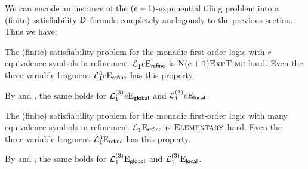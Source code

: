 We can encode an instance of the $(e+1)$-exponential tiling problem into a
(finite) satisfiability ${\mathrm{D}}$-formula completely analogously to the previous
section. Thus we have:
\begin{proposition}
The (finite) satisfiability problem for the monadic first-order logic with
$e$ equivalence symbols in refinement $\mathcal{L}^{{}}_{1}{e}\mathrm{E}_{\mathsf{refine}}$ is
$\text{\normalfont{\scshape N}}(e+1)\text{\normalfont{\scshape ExpTime}}$-hard. Even the three-variable fragment
$\mathcal{L}^{3}_{1}{e}\mathrm{E}_{\mathsf{refine}}$ has this property.

By  and , the same
holds for $\mathcal{L}^{(3)}_{1}{e}\mathrm{E}_{\mathsf{global}}$ and
$\mathcal{L}^{(3)}_{1}{e}\mathrm{E}_{\mathsf{local}}$.
\end{proposition}
\begin{proposition}
The (finite) satisfiability problem for the monadic first-order logic with many
equivalence symbols in refinement $\mathcal{L}^{{}}_{1}{{}}\mathrm{E}_{\mathsf{refine}}$ is
$\text{\normalfont{\scshape Elementary}}$-hard. Even the three-variable fragment
$\mathcal{L}^{3}_{1}{{}}\mathrm{E}_{\mathsf{refine}}$ has this property.

By  and , the same 
holds for $\mathcal{L}^{(3)}_{1}{{}}\mathrm{E}_{\mathsf{global}}$ and
$\mathcal{L}^{(3)}_{1}{{}}\mathrm{E}_{\mathsf{local}}$.
\end{proposition}